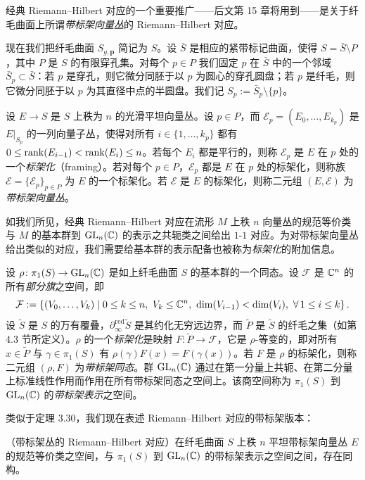 经典 Riemann--Hilbert 对应的一个重要推广——后文第 15 章将用到——是关于纤毛曲面上所谓\emph{带标架向量丛}的 Riemann--Hilbert 对应。

现在我们把纤毛曲面 $S_{g,\mathbf p}$ 简记为 $S$。设 $\bar S$ 是相应的紧带标记曲面，使得 $S=\bar S\setminus P$，其中 $P$ 是 $S$ 的有限穿孔集。对每个 $p\in P$ 我们固定 $p$ 在 $\bar S$ 中的一个邻域 $\bar S_p\subset\bar S$：若 $p$ 是穿孔，则它微分同胚于以 $p$ 为圆心的穿孔圆盘；若 $p$ 是纤毛，则它微分同胚于以 $p$ 为其直径中点的半圆盘。我们记 $S_p:=\bar S_p\setminus\{p\}$。

设 $E\to S$ 是 $S$ 上秩为 $n$ 的光滑平坦向量丛。设 $p\in P$，而 $\mathcal E_p=(E_0,\dots,E_{k_p})$ 是 $E|_{S_p}$ 的一列向量子丛，使得对所有 $i\in\{1,\dots,k_p\}$ 都有 $0\le\operatorname{rank}(E_{i-1})<\operatorname{rank}(E_i)\le n$。若每个 $E_i$ 都是平行的，则称 $\mathcal E_p$ 是 $E$ 在 $p$ 处的一个\emph{标架化}（framing）。若对每个 $p\in P$，$\mathcal E_p$ 都是 $E$ 在 $p$ 处的标架化，则称族 $\mathcal E=\{\mathcal E_p\}_{p\in P}$ 为 $E$ 的一个标架化。若 $\mathcal E$ 是 $E$ 的标架化，则称二元组 $(E,\mathcal E)$ 为\emph{带标架向量丛}。

如我们所见，经典 Riemann--Hilbert 对应在流形 $M$ 上秩 $n$ 向量丛的规范等价类与 $M$ 的基本群到 $\operatorname{GL}_n(\mathbb{C})$ 的表示之共轭类之间给出 $1$-$1$ 对应。为对带标架向量丛给出类似的对应，我们需要给基本群的表示配备也被称为\emph{标架化}的附加信息。

设 $\rho\colon\pi_1(S)\to\operatorname{GL}_n(\mathbb{C})$ 是如上纤毛曲面 $S$ 的基本群的一个同态。设 $\mathcal F$ 是 $\mathbb{C}^n$ 的所有\emph{部分旗}之空间，即
\[
\mathcal F:=\{(V_0,\dots,V_k)\mid 0\le k\le n,\ V_k\le\C^n,\ \dim(V_{i-1})<\dim(V_i),\ \forall\,1\le i\le k\}\,.
\]
设 $\widetilde{S}$ 是 $S$ 的万有覆叠，$\partial_\infty^{\mathrm{red}}\widetilde{S}$ 是其约化无穷远边界，而 $\widetilde{P}$ 是 $\widetilde{S}$ 的纤毛之集（如第 4.3 节所定义）。$\rho$ 的一个\emph{标架化}是映射 $F\colon\widetilde{P}\to\mathcal F$，它是 $\rho$-等变的，即对所有 $x\in\widetilde{P}$ 与 $\gamma\in\pi_1(S)$ 有 $\rho(\gamma)F(x)=F(\gamma(x))$。若 $F$ 是 $\rho$ 的标架化，则称二元组 $(\rho,F)$ 为\emph{带标架同态}。群 $\operatorname{GL}_n(\mathbb{C})$ 通过在第一分量上共轭、在第二分量上标准线性作用而作用在所有带标架同态之空间上。该商空间称为 $\pi_1(S)$ 到 $\operatorname{GL}_n(\mathbb{C})$ 的\emph{带标架表示}之空间。

类似于定理 3.30，我们现在表述 Riemann--Hilbert 对应的带标架版本：

\begin{theorem}[4.21]
（带标架丛的 Riemann--Hilbert 对应）\quad 在纤毛曲面 $S$ 上秩 $n$ 平坦带标架向量丛 $E$ 的规范等价类之空间，与 $\pi_1(S)$ 到 $\operatorname{GL}_n(\mathbb{C})$ 的带标架表示之空间之间，存在同构。
\end{theorem}

